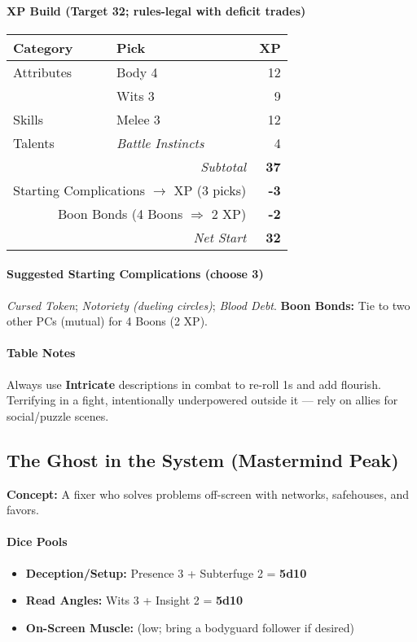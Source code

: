 \documentclass[11pt]{book}
\begin{document}
\paragraph{XP Build (Target 32; rules-legal with deficit trades)}
\begin{tabular}{@{}llr@{}}
\toprule
\textbf{Category} & \textbf{Pick} & \textbf{XP} \\
\midrule
Attributes & Body 4 & 12 \\
           & Wits 3 & 9 \\
Skills     & Melee 3 & 12 \\
Talents    & \emph{Battle Instincts} & 4 \\
\midrule
\multicolumn{2}{r}{\textit{Subtotal}} & \textbf{37} \\
\multicolumn{2}{r}{Starting Complications $\rightarrow$ XP (3 picks)} & \textbf{-3} \\
\multicolumn{2}{r}{Boon Bonds (4 Boons $\Rightarrow$ 2 XP)} & \textbf{-2} \\
\midrule
\multicolumn{2}{r}{\textit{Net Start}} & \textbf{32} \\
\bottomrule
\end{tabular}

\paragraph{Suggested Starting Complications (choose 3)}
\emph{Cursed Token}; \emph{Notoriety (dueling circles)}; \emph{Blood Debt}.  
\textbf{Boon Bonds:} Tie to two other PCs (mutual) for 4 Boons (2 XP).

\paragraph{Table Notes}
Always use \textbf{Intricate} descriptions in combat to re-roll 1s and add flourish. Terrifying in a fight, intentionally underpowered outside it — rely on allies for social/puzzle scenes.

\bigskip

\subsection*{The Ghost in the System (Mastermind Peak)}
\textbf{Concept:} A fixer who solves problems off-screen with networks, safehouses, and favors.

\paragraph{Dice Pools}
\begin{itemize}
  \item \textbf{Deception/Setup:} Presence 3 + Subterfuge 2 = \textbf{5d10}
  \item \textbf{Read Angles:} Wits 3 + Insight 2 = \textbf{5d10}
  \item \textbf{On-Screen Muscle:} (low; bring a bodyguard follower if desired)
\end{itemize}
\end{document}
